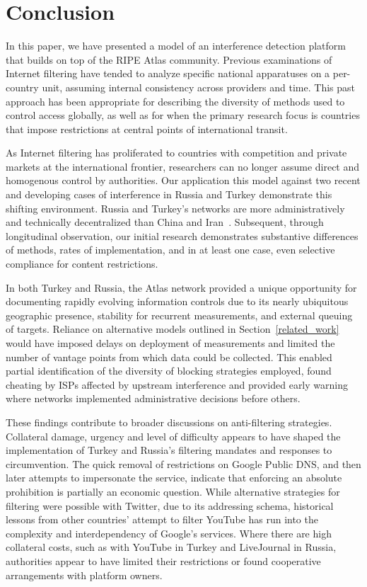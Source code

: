 \section{Conclusion}
\label{sec:conclusion}


In this paper, we have presented a model of an interference detection platform that builds on top of the RIPE Atlas community. Previous examinations of Internet filtering have tended to analyze specific national apparatuses on a per-country unit, assuming internal consistency across providers and time. This past approach has been appropriate for describing the diversity of methods used to control access globally, as well as for when the primary research focus is countries that impose restrictions at central points of international transit. 

As Internet filtering has proliferated to countries with competition and private markets at the international frontier, researchers can no longer assume direct and homogenous control by authorities. Our application this model against two recent and developing cases of interference in Russia and Turkey demonstrate this shifting environment. Russia and Turkey's networks are more administratively and technically decentralized than China and Iran~\cite{Roberts2011}. Subsequent, through longitudinal observation, our initial research demonstrates substantive differences of methods, rates of implementation, and in at least one case, even selective compliance for content restrictions. 

In both Turkey and Russia, the Atlas network provided a unique opportunity for documenting rapidly evolving information controls due to its nearly ubiquitous geographic presence, stability for recurrent measurements, and external queuing of targets. Reliance on alternative models outlined in Section~\ref{related_work} would have imposed delays on deployment of measurements and limited the number of vantage points from which data could be collected. This enabled partial identification of the diversity of blocking strategies employed, found cheating by ISPs affected by upstream interference and provided early warning where networks implemented administrative decisions before others.

These findings contribute to broader discussions on anti-filtering strategies.  Collateral damage, urgency and level of difficulty appears to have shaped the implementation of Turkey and Russia's filtering mandates and responses to circumvention. The quick removal of restrictions on Google Public DNS, and then later attempts to impersonate the service, indicate that enforcing an absolute prohibition is partially an economic question. While alternative strategies for filtering were possible with Twitter, due to its addressing schema, historical lessons from other countries' attempt to filter YouTube has run into the complexity and interdependency of Google's services. Where there are high collateral costs, such as with YouTube in Turkey and LiveJournal in Russia, authorities appear to have limited their restrictions or found cooperative arrangements with platform owners. 

